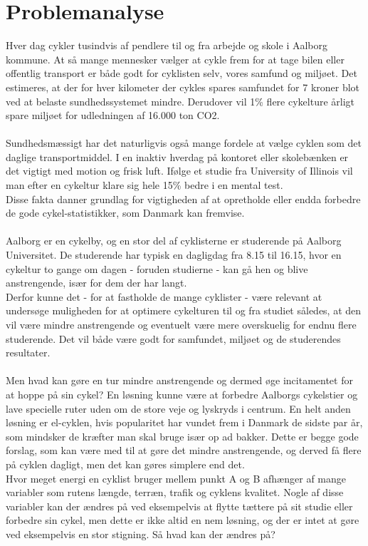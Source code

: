 \section{Problemanalyse}
Hver dag cykler tusindvis af pendlere til og fra arbejde og skole i Aalborg kommune. At så mange mennesker vælger at cykle frem for at tage bilen eller offentlig transport er både godt for cyklisten selv, vores samfund og miljøet. Det estimeres, at der for hver kilometer der cykles spares samfundet for 7 kroner blot ved at belaste sundhedssystemet mindre. Derudover vil 1\% flere cykelture årligt spare miljøet for udledningen af 16.000 ton CO2.\\
\\
Sundhedsmæssigt har det naturligvis også mange fordele at vælge cyklen som det daglige transportmiddel. I en inaktiv hverdag på kontoret eller skolebænken er det vigtigt med motion og frisk luft. Ifølge et studie fra University of Illinois vil man efter en cykeltur klare sig hele 15\% bedre i en mental test.\\
Disse fakta danner grundlag for vigtigheden af at opretholde eller endda forbedre de gode cykel-statistikker, som Danmark kan fremvise.\\
\\
Aalborg er en cykelby, og en stor del af cyklisterne er studerende på Aalborg Universitet. De studerende har typisk en dagligdag fra 8.15 til 16.15, hvor en cykeltur to gange om dagen - foruden studierne - kan gå hen og blive anstrengende, især for dem der har langt.\\
Derfor kunne det - for at fastholde de mange cyklister - være relevant at undersøge muligheden for at optimere cykelturen til og fra studiet således, at den vil være mindre anstrengende og eventuelt være mere overskuelig for endnu flere studerende. Det vil både være godt for samfundet, miljøet og de studerendes resultater.\\
\\
Men hvad kan gøre en tur mindre anstrengende og dermed øge incitamentet for at hoppe på sin cykel? En løsning kunne være at forbedre Aalborgs cykelstier og lave specielle ruter uden om de store veje og lyskryds i centrum. En helt anden løsning er el-cyklen, hvis popularitet har vundet frem i Danmark de sidste par år, som mindsker de kræfter man skal bruge især op ad bakker. Dette er begge gode forslag, som kan være med til at gøre det mindre anstrengende, og derved få flere på cyklen dagligt, men det kan gøres simplere end det.\\
Hvor meget energi en cyklist bruger mellem punkt A og B afhænger af mange variabler som rutens længde, terræn, trafik og cyklens kvalitet. Nogle af disse variabler kan der ændres på ved eksempelvis at flytte tættere på sit studie eller forbedre sin cykel, men dette er ikke altid en nem løsning, og der er intet at gøre ved eksempelvis en stor stigning. Så hvad kan der ændres på?\\
